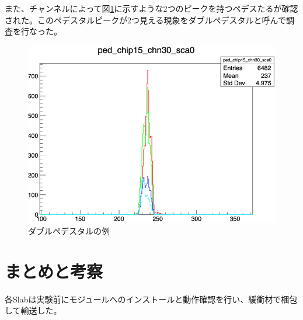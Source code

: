 また、チャンネルによって図\ref{dp}に示すような2つのピークを持つペデスたるが確認された。このペデスタルピークが2つ見える現象をダブルぺデスタルと呼んで調査を行なった。
\begin{figure}[H]
\begin{center}
 \includegraphics[keepaspectratio, scale=0.3]
 	{Figure/Beamtest/pedestal.png}
 		\caption{ダブルペデスタルの例}
		\label{dp}
\end{center}
\end{figure}
\section{まとめと考察}
各Slabは実験前にモジュールへのインストールと動作確認を行い、緩衝材で梱包して輸送した。